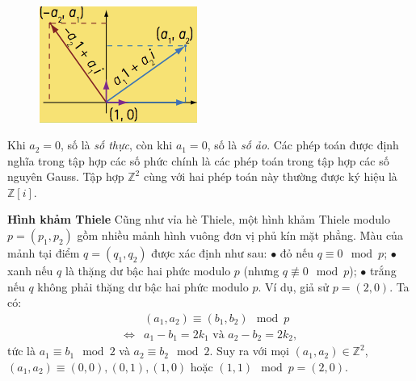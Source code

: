 \begin{multicols}{2}
\begin{tBox}
\begin{align*}
		\end{align*}
		\begin{figure}
			\vspace*{-15pt}
			\centering
			\captionsetup{labelformat= empty, justification=centering}
			\hspace*{-12pt}\includegraphics[width= 1.1\linewidth]{mosaique-7.png}
			\vspace*{-15pt}
		\end{figure}
		Khi $a_2 = 0$, số là {\em số thực}, còn khi $a_1 = 0$, số là {\em số ảo}.
		Các phép toán được định nghĩa trong tập hợp các số phức chính là các phép toán trong tập hợp các số nguyên Gauss. Tập hợp $\mathbb Z^2$ cùng với hai phép toán này thường được ký hiệu là $\mathbb Z[i]$.
	\end{tBox}
	\vskip 0.1cm
	\textbf{\color{toanhocdoisong}Hình khảm Thiele}
	\vskip 0.1cm
	Cũng như vỉa hè Thiele, một hình khảm Thiele modulo $p = (p_1, p_2)$ gồm nhiều mảnh hình vuông đơn vị phủ kín mặt phẳng. Màu của mảnh tại điểm $q = (q_1, q_2)$ được xác định như sau:
	\vskip 0.1cm
	$\bullet$	đỏ nếu $q \equiv 0 \mod{p}$;
	\vskip 0.1cm
	$\bullet$	xanh nếu $q$ là thặng dư bậc hai phức modulo $p$ (nhưng $q \not\equiv 0 \mod{p}$);
	\vskip 0.1cm
	$\bullet$	trắng nếu $q$ không phải thặng dư bậc hai phức modulo $p$.
	\vskip 0.1cm
	Ví dụ, giả sử $p = (2, 0)$. Ta có:
	\begin{align*}
		&(a_1, a_2) \equiv (b_1, b_2) \mod{p} \\
		\iff& a_1 - b_1 = 2 k_1 \mbox{ và } a_2 - b_2 = 2 k_2,
	\end{align*}
	tức là $a_1 \equiv b_1 \mod{2}$ và $a_2 \equiv b_2 \mod{2}$. Suy ra với mọi $(a_1, a_2) \in \mathbb Z^2$, $(a_1, a_2) \equiv (0, 0), (0, 1), (1, 0)$ hoặc $(1, 1) \mod{p = (2, 0)}$.

\end{multicols}
